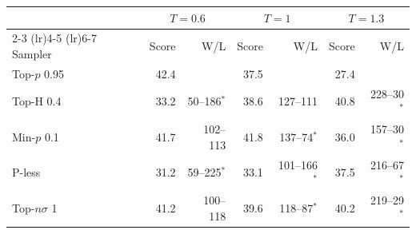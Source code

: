 \begin{tabular}{lrrrrrr}
\toprule
& \multicolumn{2}{c}{$T{=}0.6$} & \multicolumn{2}{c}{$T{=}1$} & \multicolumn{2}{c}{$T{=}1.3$} \\
\cmidrule(lr){2-3} \cmidrule(lr){4-5} \cmidrule(lr){6-7}
Sampler & Score & W/L & Score & W/L & Score & W/L \\
\midrule
Top-$p$ 0.95 & 42.4 &  & 37.5 &  & 27.4 &  \\
Top-H 0.4 & 33.2 & 50--186$^{*}$ & 38.6 & 127--111 & 40.8 & 228--30$^{*}$ \\
Min-$p$ 0.1 & 41.7 & 102--113 & 41.8 & 137--74$^{*}$ & 36.0 & 157--30$^{*}$ \\
P-less & 31.2 & 59--225$^{*}$ & 33.1 & 101--166$^{*}$ & 37.5 & 216--67$^{*}$ \\
Top-$n\sigma$ 1 & 41.2 & 100--118 & 39.6 & 118--87$^{*}$ & 40.2 & 219--29$^{*}$ \\
\bottomrule
\end{tabular}